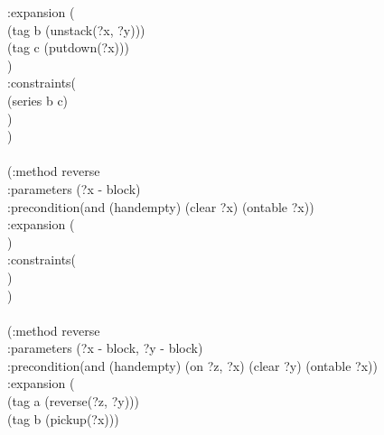 \begin{appendix}
\hspace*{2cm}  :expansion  (\\
\hspace*{2.5cm}        (tag b (unstack(?x, ?y)))\\
\hspace*{2.5cm}        (tag c (putdown(?x)))\\
\hspace*{2cm}  )\\
\hspace*{2cm}  :constraints(\\
\hspace*{2.5cm}        (series b c)\\
\hspace*{2cm}  )\\
\hspace*{1.5cm})
\\
\\ \hspace*{1.5cm}(:method reverse\\
\hspace*{2cm}  :parameters  (?x - block)\\
\hspace*{2cm}  :precondition(and (handempty) (clear ?x) (ontable ?x))\\
\hspace*{2cm}  :expansion  (\\
\hspace*{2cm}  )\\
\hspace*{2cm}  :constraints(\\
\hspace*{2cm}  )\\
\hspace*{1.5cm})
\\
\\ \hspace*{1.5cm}(:method reverse\\
\hspace*{2cm}  :parameters  (?x - block, ?y - block)\\
\hspace*{2cm}  :precondition(and (handempty) (on ?z, ?x) (clear ?y) (ontable ?x))\\
\hspace*{2cm}  :expansion  (\\
\hspace*{2.5cm}        (tag a (reverse(?z, ?y)))\\
\hspace*{2.5cm}        (tag b (pickup(?x)))\\

\end{appendix}
